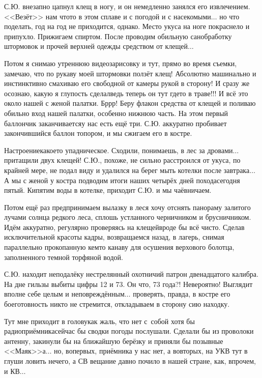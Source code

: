 С.Ю. внезапно цапнул клещ в ногу, и он немедленно занялся его извлечением. <<Везёт>> нам что\sdash то в этом сплаве и с погодой и с насекомыми$\ldots$ но что поделать, год на год не приходится, однако. Место укуса на ноге покраснело и припухло. Прижигаем спиртом. После проводим обильную санобработку штормовок и прочей верхней одежды средством от клещей$\ldots$
 
Потом я снимаю утреннюю видеозарисовку и тут, прямо во время съемки, замечаю, что по рукаву моей штормовки ползёт клещ! Абсолютно машинально и инстинктивно смахиваю его свободной от камеры рукой в сторону! И сразу же осознаю, какую я глупость сделал\mdash ведь теперь он тут где\sdash то в траве!!! И всё это около нашей с женой палатки. Бр\sdash р\sdash р! Беру флакон средства от клещей и поливаю обильно вход нашей палатки, особенно нижнюю часть. На этом первый баллончик заканчивается\mdash у нас есть ещё три. С.Ю. аккуратно пробивает закончившийся баллон топором, и мы сжигаем его в костре. 

Настроение\mdash какое\sdash то упадническое. Сходили, понимаешь, в лес за дровами$\ldots$ притащили двух клещей! С.Ю., похоже, не сильно расстроился от укуса, по крайней мере, не подал виду и удалился на берег мыть котелки после завтрака$\ldots$ А мы с женой у костра подводим итоги наших четырёх дней похода\mdash сегодня пятый. Кипятим воды в котелке, приходит С.Ю. и мы чаёвничаем.

Потом ещё раз предпринимаем вылазку в лес\mdash я хочу отснять панораму залитого лучами солнца редкого леса, сплошь устланного черничником и брусничником. Идём аккуратно, регулярно проверяясь на клещей\mdash вроде бы всё чисто. Сделав исключительной красоты кадры, возвращаемся назад, в лагерь, снимая параллельно прокопанную кем\sdash то канаву для осушения верхового болотца, заполненного темной торфяной водой.

С.Ю. находит неподалёку нестрелянный охотничий патрон двенадцатого калибра. На дне гильзы выбиты цифры 12 и 73. Он что, 73 года?! Невероятно! Выглядит вполне себе целым и неповреждённым$\ldots$ проверять, правда, в костре его боеготовность никто не стремится, откладываем в сторону сию находку. 

Тут мне приходит в голову\mdash как жаль, что нет с~собой хотя бы радиоприёмника\mdash сейчас бы сводки погоды послушали. Сделали бы из проволоки антенну, закинули бы на ближайшую берёзку и приняли бы позывные <<Маяк>>\sdash а$\ldots$ но, во\sdash первых, приёмника у нас нет, а во\sdash вторых, на УКВ тут в глуши ловить нечего, а СВ вещание давно почило в нашей стране, как, впрочем, и КВ$\ldots$

